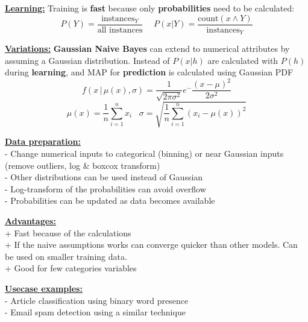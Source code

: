 \documentclass[letterpaper, 10.5pt,landscape]{article}
\begin{document}
\begin{multicols*}{3}
\vspace{3pt}
\textbf{\underline{Learning:}} Training is \textbf{fast} because only \textbf{probabilities} need to be calculated: 
\vspace{-5pt}
\[\boxed{P(Y) = \frac{\text{instances}_{Y}}{ \text{all instances}}} \hspace{15pt} \boxed{P(x|Y) = \frac{\text{count}(x \land Y  )}{\text{instances}_{Y}}}\]



\vspace{3pt} 
\textbf{\underline{Variations:}} \textbf{Gaussian Naive Bayes} can extend to numerical attributes by assuming a Gaussian distribution. Instead of $P(x|h)$ are calculated with $P(h)$ during \textbf{learning}, and MAP for \textbf{prediction} is calculated using Gaussian PDF
\vspace{-5pt}
\[\boxed{f(x \, | \,  \mu(x), \sigma) = \frac{1}{\sqrt{2 \pi \sigma^{2}}} e^-{\frac{(x-\mu)^{2}}{2\sigma^{2}}} }\]
\vspace{-5pt}
\[\mu(x) = \frac{1}{n} \sum^{n}_{i=1} x_{i} \hspace{10pt}  \sigma = \sqrt{\frac{1}{n} \sum^{n}_{i=1} \left( x_{i} - \mu(x) \right)^{2}} \]




\vspace{3pt}
\textbf{\underline{Data preparation:}} \\
- Change numerical inputs to categorical (binning) or near Gaussian inputs (remove outliers, log \& boxcox transform) \\
- Other distributions can be used instead of Gaussian \\
- Log-transform of the probabilities can avoid overflow \\
- Probabilities can be updated as data becomes available


\vspace{3pt}
\textbf{\underline{Advantages:}} \\
+ Fast because of the calculations \\
+ If the naive assumptions works can converge quicker than other models. Can be used on smaller training data.  \\
+ Good for few categories variables


\vspace{3pt}
\textbf{\underline{Usecase examples:}} \\
- Article classification using binary word presence \\
- Email spam detection using a similar technique



\end{multicols*}
\end{document}
